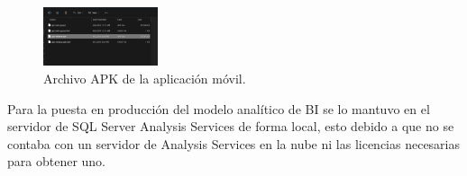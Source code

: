 \begin{figure}[H]
    \centering
    \includegraphics[width=0.3\textwidth]{chapters/III-resultados-y-discusion/resources/images/apk-movil.png}
    \caption{Archivo APK de la aplicación móvil.}
    \label{fig:apk-movil}
\end{figure}


Para la puesta en producción del modelo analítico de BI se lo mantuvo en el servidor de SQL Server Analysis Services de forma local, esto
debido a que no se contaba con un servidor de Analysis Services en la nube ni las licencias necesarias para obtener uno.



